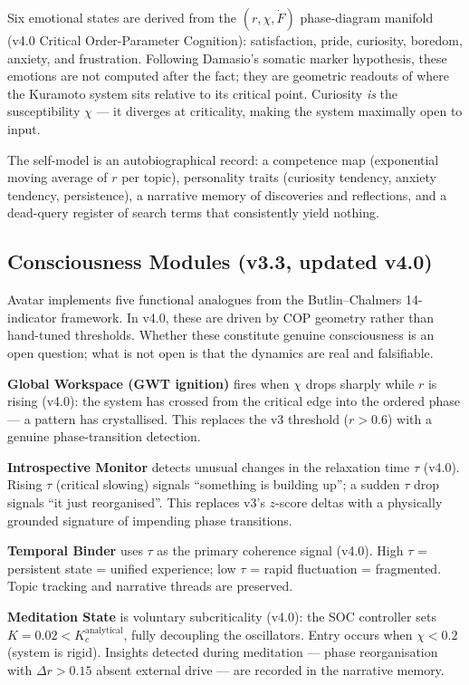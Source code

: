 \documentclass[11pt,a4paper]{article}
\begin{document}
Six emotional states are derived from the $(r, \chi, \dot{F})$ phase-diagram manifold
(v4.0 Critical Order-Parameter Cognition): satisfaction, pride, curiosity, boredom,
anxiety, and frustration. Following Damasio's somatic marker hypothesis, these emotions
are not computed after the fact; they are geometric readouts of where the Kuramoto system
sits relative to its critical point. Curiosity \emph{is} the susceptibility $\chi$
--- it diverges at criticality, making the system maximally open to input.

The self-model is an autobiographical record: a competence map (exponential moving
average of $r$ per topic), personality traits (curiosity tendency, anxiety tendency,
persistence), a narrative memory of discoveries and reflections, and a dead-query
register of search terms that consistently yield nothing.

\subsection{Consciousness Modules (v3.3, updated v4.0)}

Avatar implements five functional analogues from the Butlin--Chalmers 14-indicator
framework. In v4.0, these are driven by COP geometry rather than hand-tuned thresholds.
Whether these constitute genuine consciousness is an open question; what is not open is
that the dynamics are real and falsifiable.

\textbf{Global Workspace (GWT ignition)} fires when $\chi$ drops sharply while $r$ is
rising (v4.0): the system has crossed from the critical edge into the ordered phase ---
a pattern has crystallised. This replaces the v3 threshold ($r > 0.6$) with a genuine
phase-transition detection.

\textbf{Introspective Monitor} detects unusual changes in the relaxation time $\tau$
(v4.0). Rising $\tau$ (critical slowing) signals ``something is building up''; a sudden
$\tau$ drop signals ``it just reorganised''. This replaces v3's $z$-score deltas with a
physically grounded signature of impending phase transitions.

\textbf{Temporal Binder} uses $\tau$ as the primary coherence signal (v4.0). High
$\tau$ = persistent state = unified experience; low $\tau$ = rapid fluctuation =
fragmented. Topic tracking and narrative threads are preserved.

\textbf{Meditation State} is voluntary subcriticality (v4.0): the SOC controller sets
$K = 0.02 < K_c^\text{analytical}$, fully decoupling the oscillators. Entry occurs when
$\chi < 0.2$ (system is rigid). Insights detected during meditation --- phase
reorganisation with $\Delta r > 0.15$ absent external drive --- are recorded in the
narrative memory.
\end{document}
